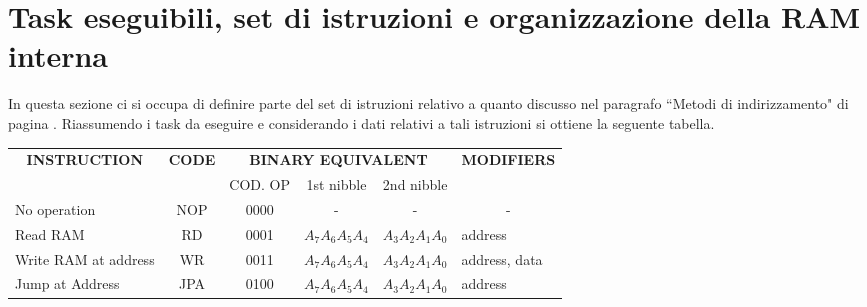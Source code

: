 \section {Task eseguibili, set di istruzioni e organizzazione della RAM interna}
In questa sezione ci si occupa di definire parte del set di istruzioni relativo a quanto discusso nel paragrafo \textquotedblleft Metodi di indirizzamento" di pagina \pageref{metodi_di_indirizzamento}. Riassumendo i task da eseguire e considerando i dati relativi a tali istruzioni si ottiene la seguente tabella.
\begin{table}[H]
	\centering
	\footnotesize
	\fontsize{10}{18}\selectfont
	\begin{tabular}{|p{0.5cm}|p{0.5cm}|p{0.5cm}|p{0.5cm}|p{0.5cm}|p{0.5cm}|}
		\hline
		\multicolumn{1}{|c|}{\textbf{INSTRUCTION}} & \multicolumn{1}{c|}{\textbf{CODE}} & 
		\multicolumn{3}{c|}{\textbf{BINARY EQUIVALENT}} & \multicolumn{1}{l|}{\textbf{MODIFIERS}} \\
		
		& & \multicolumn{1}{|c|}{COD. OP}  & \multicolumn{1}{|c|}{1st nibble} & \multicolumn{1}{|c|}{2nd nibble} & 	 \\ \hline
		
		\multicolumn{1}{|l|}{No operation}	&
		\multicolumn{1}{|c|}{NOP}  &
		\multicolumn{1}{|c|}{0000}	&
		\multicolumn{1}{|c|}{-} &
		\multicolumn{1}{|c|}{-} &
		\multicolumn{1}{|c|}{-}	\\ \hline
		
		
		\multicolumn{1}{|l|}{Read RAM}	&
		\multicolumn{1}{|c|}{RD}  &
		\multicolumn{1}{|c|}{0001}	&
		\multicolumn{1}{|c|}{$A_7A_6A_5A_4$} &
		\multicolumn{1}{|c|}{$A_3A_2A_1A_0$} &
		\multicolumn{1}{|l|}{address}	\\ \hline
		
		\multicolumn{1}{|l|}{Write RAM at address}	&
		\multicolumn{1}{|c|}{WR}  &
		\multicolumn{1}{|c|}{0011}	&
		\multicolumn{1}{|c|}{$A_7A_6A_5A_4$} &
		\multicolumn{1}{|c|}{$A_3A_2A_1A_0$} &
		\multicolumn{1}{|l|}{address, data}	\\ \hline
		
		\multicolumn{1}{|l|}{Jump at Address}	&
		\multicolumn{1}{|c|}{JPA}  &
		\multicolumn{1}{|c|}{0100}	&
		\multicolumn{1}{|c|}{$A_7A_6A_5A_4$} &
		\multicolumn{1}{|c|}{$A_3A_2A_1A_0$} &
		\multicolumn{1}{|l|}{address}	\\ \hline
		

\end{tabular}
\end{table}
